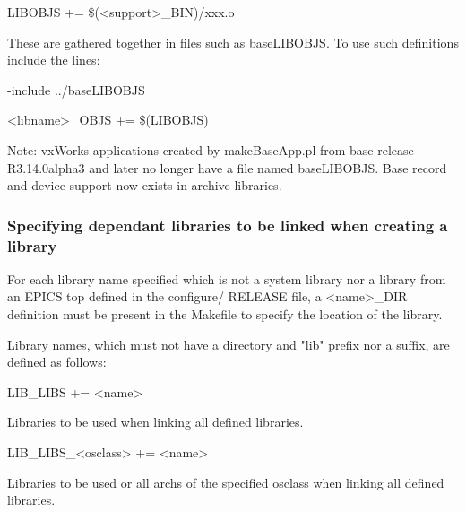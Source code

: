 \begin{description}\item LIBOBJS += \$(\textless{}support\textgreater{}\_BIN)/xxx.o

\end{description}These are gathered together in files such as baseLIBOBJS. To use such definitions include the lines:

\begin{description}\item -include ../baseLIBOBJS

\item \textless{}libname\textgreater{}\_OBJS += \$(LIBOBJS)

\end{description}Note: vxWorks applications created by makeBaseApp.pl from base release R3.14.0alpha3 and later no longer have a file 
named baseLIBOBJS. Base record and device support now exists in archive libraries.

\subsubsection{Specifying dependant libraries to be linked when creating a library}

For each library name specified which is not a system library nor a library from an EPICS top defined in the configure/
RELEASE file, a \textless{}name\textgreater{}\_DIR definition must be present in the Makefile to specify the location of the library. 

Library names, which must not have a directory and "lib" prefix nor a suffix, are defined as follows:

\begin{description}\item {}LIB\_LIBS += \textless{}name\textgreater{}

\end{description}Libraries to be used when linking all defined libraries.

\begin{description}\item LIB\_LIBS\_\textless{}osclass\textgreater{} += \textless{}name\textgreater{}

\end{description}Libraries to be used or all archs of the specified osclass when linking all defined libraries.

